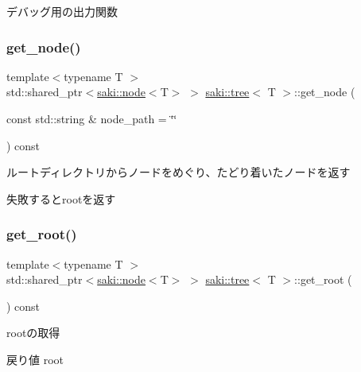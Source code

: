 デバッグ用の出力関数 

\mbox{\label{classsaki_1_1tree_a796564f1228f24be4bda5f1f82ba44c3}} 
\subsubsection{\texorpdfstring{get\+\_\+node()}{get\_node()}}
{\footnotesize\ttfamily template$<$typename T $>$ \\
std\+::shared\+\_\+ptr$<$\mbox{\hyperlink{classsaki_1_1node}{saki\+::node}}$<$T$>$ $>$ \mbox{\hyperlink{classsaki_1_1tree}{saki\+::tree}}$<$ T $>$\+::get\+\_\+node (\begin{DoxyParamCaption}\item[{const std\+::string \&}]{node\+\_\+path = {\ttfamily \char`\"{}\char`\"{}} }\end{DoxyParamCaption}) const\hspace{0.3cm}{\ttfamily [inline]}}



ルートディレクトリからノードをめぐり、たどり着いたノードを返す 

失敗するとrootを返す \mbox{\label{classsaki_1_1tree_a6e1fd64555848330aa28f3273953abbb}} 
\subsubsection{\texorpdfstring{get\+\_\+root()}{get\_root()}}
{\footnotesize\ttfamily template$<$typename T $>$ \\
std\+::shared\+\_\+ptr$<$\mbox{\hyperlink{classsaki_1_1node}{saki\+::node}}$<$T$>$ $>$ \mbox{\hyperlink{classsaki_1_1tree}{saki\+::tree}}$<$ T $>$\+::get\+\_\+root (\begin{DoxyParamCaption}{ }\end{DoxyParamCaption}) const\hspace{0.3cm}{\ttfamily [inline]}}



rootの取得 

\begin{DoxyReturn}{戻り値}
root 
\end{DoxyReturn}
\mbox{\label{classsaki_1_1tree_aaeea7b41a15310740f23776e50c77554}} 
